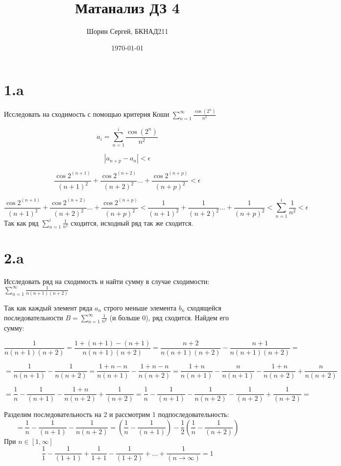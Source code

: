 \documentclass[a4paper]{article}
\author{Шорин Сергей, БКНАД211}
\title{Матанализ ДЗ 4}
\date{\today}
\begin{document}
\maketitle



\section*{1.a}
Исследовать на сходимость с помощью критерия Коши $\sum^{\infty}_{n=1}  \frac{\cos (2 ^ n)}{n^2}$

$$a_i = \sum^{i}_{n=1}  \frac{\cos (2 ^ n)}{n^2}$$

$$ |a_{n + p} - a_n |  < \epsilon$$

$$ \frac{\cos 2 ^ {(n + 1)}}{(n + 1)^2}
+ \frac{\cos 2 ^ {(n + 2)}}{(n + 2)^2}
...
+ \frac{\cos 2 ^ {(n + p)}}{(n + p)^2} <  \epsilon$$

$$ \frac{\cos 2 ^ {(n + 1)}}{(n + 1)^2}
+ \frac{\cos 2 ^ {(n + 2)}}{(n + 2)^2}
...
+ \frac{\cos 2 ^ {(n + p)}}{(n + p)^2}
<
\frac{1}{(n + 1)^2}
+ \frac{1}{(n + 2)^2}
...
+ \frac{1}{(n + p)^2} < 
\sum^{i}_{n=1}  \frac{1}{n^2}
<
\epsilon$$
Так как ряд $\sum^{i}_{n=1}  \frac{1}{n^2}$ сходится, исходный ряд так же сходится.

\section*{2.a}
Исследовать ряд на сходимость и найти сумму в случае сходимости: $\sum^{\infty}_{n=1}  \frac{1}{n(n + 1)(n + 2)}$

Так как каждый элемент ряда $a_n$ строго меньше элемента   $b_n$ сходящейся последовательности $ B = \sum^{\infty}_{n=1}  \frac{1}{n^2}$ (и больше 0), ряд сходится. Найдем его сумму:

$$\frac{1}{n(n + 1)(n + 2)} = \frac{1 + (n + 1) - (n+ 1)}{n(n + 1)(n + 2)} = \frac{n + 2}{n(n + 1)(n + 2)} - \frac{ n + 1}{n(n + 1)(n + 2)} = $$

$$ = \frac{1}{n(n + 1)} - \frac{ 1}{n(n + 2)} = 
\frac{1 + n - n}{n(n + 1)} - \frac{ 1 + n - n}{n(n + 2)}
=
\frac{1 + n}{n(n + 1)} - \frac{n}{n(n + 1)} - \frac{ 1 + n}{n(n + 2)} + \frac{  n}{n(n + 2)}
$$

$$= \frac{1}{n} - \frac{1}{(n + 1)} - \frac{ 1 + n}{n(n + 2)} + \frac{  1}{(n + 2)}=
\frac{1}{n} - \frac{1}{(n + 1)} - \frac{ 1}{n(n + 2)} - \frac{ 1}{(n + 2)}+ \frac{  1}{(n + 2)} = 
$$

Разделим последовательность на 2 и рассмотрим 1 подпоследовательность:
$$= \frac{1}{n} - \frac{1}{(n + 1)} - \frac{ 1}{n(n + 2)} = (\frac{1}{n} - \frac{1}{(n + 1)}) - \frac{1}{2}(\frac{1}{n} - \frac{1}{(n + 2)})  
$$
При $n \in [1, \infty]$
$$ \frac{1}{1} - \frac{1}{(1 + 1)} + \frac{1}{1 + 1} - \frac{1}{(1 + 2)} + ... + \frac{1}{(n \to \infty)} = 1$$
\end{document}
